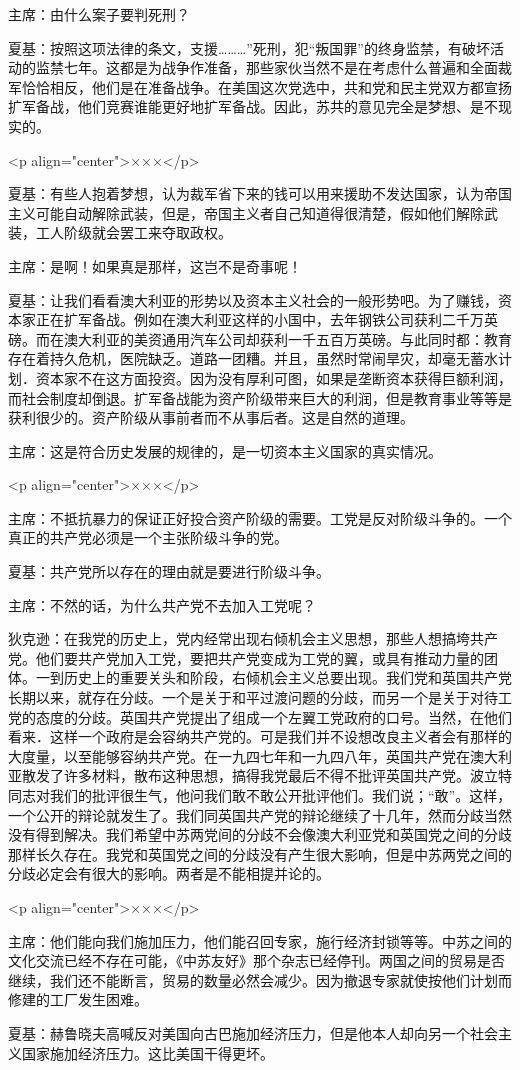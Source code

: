 主席：由什么案子要判死刑？

夏基：按照这项法律的条文，支援………”死刑，犯“叛国罪”的终身监禁，有破坏活动的监禁七年。这都是为战争作准备，那些家伙当然不是在考虑什么普遍和全面裁军恰恰相反，他们是在准备战争。在美国这次党选中，共和党和民主党双方都宣扬扩军备战，他们竞赛谁能更好地扩军备战。因此，苏共的意见完全是梦想、是不现实的。

<p align="center">×××</p>

夏基：有些人抱着梦想，认为裁军省下来的钱可以用来援助不发达国家，认为帝国主义可能自动解除武装，但是，帝国主义者自己知道得很清楚，假如他们解除武装，工人阶级就会罢工来夺取政权。

主席：是啊！如果真是那样，这岂不是奇事呢！

夏基：让我们看看澳大利亚的形势以及资本主义社会的一般形势吧。为了赚钱，资本家正在扩军备战。例如在澳大利亚这样的小国中，去年钢铁公司获利二千万英磅。而在澳大利亚的美资通用汽车公司却获利一千五百万英磅。与此同时都：教育存在着持久危机，医院缺乏。道路一团糟。并且，虽然时常闹旱灾，却毫无蓄水计划．资本家不在这方面投资。因为没有厚利可图，如果是垄断资本获得巨额利润，而社会制度却倒退。扩军备战能为资产阶级带来巨大的利润，但是教育事业等等是获利很少的。资产阶级从事前者而不从事后者。这是自然的道理。

主席：这是符合历史发展的规律的，是一切资本主义国家的真实情况。

<p align="center">×××</p>

主席：不抵抗暴力的保证正好投合资产阶级的需要。工党是反对阶级斗争的。一个真正的共产党必须是一个主张阶级斗争的党。

夏基：共产党所以存在的理由就是要进行阶级斗争。

主席：不然的话，为什么共产党不去加入工党呢？

狄克逊：在我党的历史上，党内经常出现右倾机会主义思想，那些人想搞垮共产党。他们要共产党加入工党，要把共产党变成为工党的翼，或具有推动力量的团体。一到历史上的重要关头和阶段，右倾机会主义总要出现。我们党和英国共产党长期以来，就存在分歧。一个是关于和平过渡问题的分歧，而另一个是关于对待工党的态度的分歧。英国共产党提出了组成一个左翼工党政府的口号。当然，在他们看来．这样一个政府是会容纳共产党的。可是我们并不设想改良主义者会有那样的大度量，以至能够容纳共产党。在一九四七年和一九四八年，英国共产党在澳大利亚散发了许多材料，散布这种思想，搞得我党最后不得不批评英国共产党。波立特同志对我们的批评很生气，他问我们敢不敢公开批评他们。我们说；“敢”。这样，一个公开的辩论就发生了。我们同英国共产党的辩论继续了十几年，然而分歧当然没有得到解决。我们希望中苏两党间的分歧不会像澳大利亚党和英国党之间的分歧那样长久存在。我党和英国党之间的分歧没有产生很大影响，但是中苏两党之间的分歧必定会有很大的影响。两者是不能相提并论的。

<p align="center">×××</p>

主席：他们能向我们施加压力，他们能召回专家，施行经济封锁等等。中苏之间的文化交流已经不存在可能，《中苏友好》那个杂志已经停刊。两国之间的贸易是否继续，我们还不能断言，贸易的数量必然会减少。因为撤退专家就使按他们计划而修建的工厂发生困难。

夏基：赫鲁晓夫高喊反对美国向古巴施加经济压力，但是他本人却向另一个社会主义国家施加经济压力。这比美国干得更坏。


